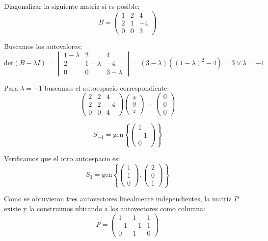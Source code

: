 \begin{example}
 Diagonalizar la siguiente matriz si es posible:
\[ B = \begin{pmatrix}
1 & 2 & 4 \\
2 & 1 & -4 \\
0 & 0 & 3
\end{pmatrix} \]

Buscamos los autovalores:
\[ \text{det}(B - \lambda I) = \begin{vmatrix}
1 - \lambda & 2 & 4 \\
2 & 1 - \lambda & -4 \\
0 & 0 & 3 - \lambda
\end{vmatrix} = (3 - \lambda) ((1 - \lambda)^2 - 4) = 3 \lor \lambda = -1 \]

Para \( \lambda = -1 \) buscamos el autoespacio correspondiente:
\[ \begin{pmatrix}
2 & 2 & 4 \\
2 & 2 & -4 \\
0 & 0 & 4
\end{pmatrix} \begin{pmatrix} x \\ y \\ z \end{pmatrix} = \begin{pmatrix} 0 \\ 0 \\ 0 \end{pmatrix} \]

\[ S_{-1} = \text{gen} \left\{ \begin{pmatrix} 1 \\ -1 \\ 0 \end{pmatrix} \right\} \]

Verificamos que el otro autoespacio es:
\[ S_3 = \text{gen} \left\{ \begin{pmatrix} 1 \\ 1 \\ 0 \end{pmatrix}, \begin{pmatrix} 2 \\ 0 \\ 1 \end{pmatrix} \right\} \]

Como se obtuvieron  tres autovectores linealmente independientes, la matriz \( P \) existe y la construimos ubicando a los autovectores como columna:
\[ P = \begin{pmatrix}
1 & 1 & 1 \\
-1 & -1 & 1 \\
0 & 1 & 0
\end{pmatrix} \]


\end{example}
